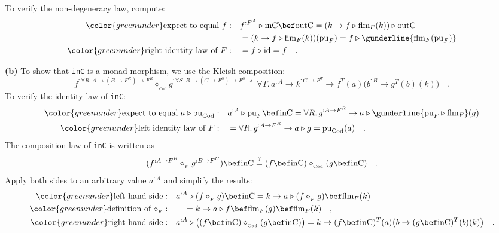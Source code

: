 To verify the non-degeneracy law, compute:
\begin{align*}
{\color{greenunder}\text{expect to equal }f:}\quad & f^{:F^{A}}\triangleright\text{inC}\bef\text{outC}=(k\rightarrow f\triangleright\text{flm}_{F}(k))\triangleright\text{outC}\\
 & =(k\rightarrow f\triangleright\text{flm}_{F}(k))(\text{pu}_{F})=f\triangleright\gunderline{\text{flm}_{F}(\text{pu}_{F})}\\
{\color{greenunder}\text{right identity law of }F:}\quad & =f\triangleright\text{id}=f\quad.
\end{align*}

\textbf{(b)} To show that \lstinline!inC! is a monad morphism, we
use the Kleisli composition:
\[
f^{:\forall R.\,A\rightarrow(B\rightarrow F^{R})\rightarrow F^{R}}\diamond_{_{\text{Cod}}}g^{:\forall S.\,B\rightarrow(C\rightarrow F^{S})\rightarrow F^{S}}\triangleq\forall T.\,a^{:A}\rightarrow k^{:C\rightarrow F^{T}}\rightarrow f^{T}(a)\big(b^{:B}\rightarrow g^{T}(b)(k)\big)\quad.
\]
To verify the identity law of \lstinline!inC!:
\begin{align*}
{\color{greenunder}\text{expect to equal }a\triangleright\text{pu}_{\text{Cod}}:}\quad & a^{:A}\triangleright\text{pu}_{F}\bef\text{inC}=\forall R.\,g^{:A\rightarrow F^{R}}\rightarrow a\triangleright\gunderline{\text{pu}_{F}\triangleright\text{flm}_{F}}(g)\\
{\color{greenunder}\text{left identity law of }F:}\quad & =\forall R.\,g^{:A\rightarrow F^{R}}\rightarrow a\triangleright g=\text{pu}_{\text{Cod}}(a)\quad.
\end{align*}
The composition law of \lstinline!inC! is written as
\[
(f^{:A\rightarrow F^{B}}\diamond_{_{F}}g^{:B\rightarrow F^{C}})\bef\text{inC}\overset{?}{=}(f\bef\text{inC})\diamond_{_{\text{Cod}}}(g\bef\text{inC})\quad.
\]
Apply both sides to an arbitrary value $a^{:A}$ and simplify the
results:
\begin{align*}
{\color{greenunder}\text{left-hand side}:}\quad & a^{:A}\triangleright(f\diamond_{_{F}}g)\bef\text{inC}=k\rightarrow a\triangleright(f\diamond_{_{F}}g)\bef\text{flm}_{F}(k)\\
{\color{greenunder}\text{definition of }\diamond_{_{F}}:}\quad & \quad=k\rightarrow a\triangleright f\bef\text{flm}_{F}(g)\bef\text{flm}_{F}(k)\quad,\\
{\color{greenunder}\text{right-hand side}:}\quad & a^{:A}\triangleright\big((f\bef\text{inC})\diamond_{_{\text{Cod}}}(g\bef\text{inC})\big)=k\rightarrow(f\bef\text{inC})^{T}(a)\big(b\rightarrow(g\bef\text{inC})^{T}(b)(k)\big)\quad.
\end{align*}
